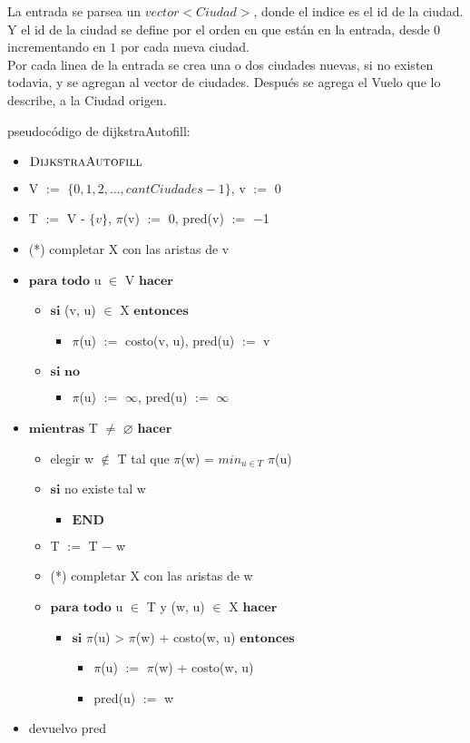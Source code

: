 \noindent
La entrada se parsea un $vector<Ciudad>$, donde el indice es el id de la ciudad. Y el id de la ciudad se define por el orden en que est\'an en la entrada, desde $0$ incrementando en $1$ por cada nueva ciudad.\\
Por cada linea de la entrada se crea una o dos ciudades nuevas, si no existen todavia, y se agregan al vector de ciudades. Despu\'es se agrega el Vuelo que lo describe, a la Ciudad origen.\\
\bigskip

\noindent
pseudoc\'odigo de dijkstraAutofill: \\


\begin{itemize}
\item $\textnormal{\scshape DijkstraAutofill}$
\item V $:=$ $\{0,1,2,...,cantCiudades-1\}$, v $:=$ $0$
\item T $:=$ V - $\{v\}$, $\pi$(v) $:=$ $0$, pred(v) $:=$ $-$1 
\item (*) completar X con las aristas de v
\item $\textbf{para todo}$ u $\in$ V $\textbf{hacer}$
\begin{itemize}
	\item $\textbf{si}$ (v, u) $\in$ X $\textbf{entonces}$
	\begin{itemize}
		\item $\pi$(u) $:=$ costo(v, u), pred(u) $:=$ v
	\end{itemize}
	\item $\textbf{si no}$
	\begin{itemize}
		\item $\pi$(u) $:=$ $\infty$, pred(u) $:=$ $\infty$
	\end{itemize}
\end{itemize}
\item $\textbf{mientras}$ T $\neq$ $\varnothing$ $\textbf{hacer}$
\begin{itemize}
	\item elegir w $\notin$ T tal que $\pi$(w) = $min_{u \in T}$ $\pi$(u)
	\item $\textbf{si}$ no existe tal w 
	\begin{itemize}
		\item $\textbf{END}$
	\end{itemize}
	\item T $:=$ T $-$ w 
	\item (*) completar X con las aristas de w
	\item $\textbf{para todo}$ u $\in$ T y (w, u) $\in$ X $\textbf{hacer}$
	\begin{itemize}
		\item $\textbf{si}$ $\pi$(u) > $\pi$(w) + costo(w, u) $\textbf{entonces}$
		\begin{itemize}
			\item $\pi$(u) $:=$ $\pi$(w) + costo(w, u)
			\item pred(u) $:=$ w
		\end{itemize}
	\end{itemize}
\end{itemize}
\item devuelvo pred
\end{itemize}
\bigskip


